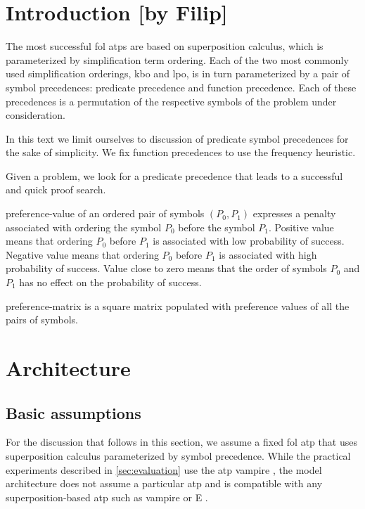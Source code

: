 \newpage

\section{Introduction [by Filip]}

The most successful \gls{fol} \glspl{atp} are based on superposition calculus,
which is parameterized by simplification term ordering.
Each of the two most commonly used simplification orderings, \gls{kbo} and \gls{lpo},
is in turn parameterized by a pair of symbol precedences:
predicate precedence and function precedence.
Each of these precedences is a permutation of the respective symbols of the problem under consideration.

In this text we limit ourselves to discussion of predicate symbol precedences for the sake of simplicity.
We fix function precedences to use the frequency heuristic.

Given a problem, we look for a predicate \gls{precedence} that leads to a successful and quick proof search.

\Gls{preference-value} of an ordered pair of symbols \((P_0, P_1)\) expresses a penalty associated with ordering the symbol \(P_0\) before the symbol \(P_1\).
Positive value means that ordering \(P_0\) before \(P_1\) is associated with low probability of success.
Negative value means that ordering \(P_0\) before \(P_1\) is associated with high probability of success.
Value close to zero means that the order of symbols \(P_0\) and \(P_1\) has no effect on the probability of success.

\Gls{preference-matrix} is a square matrix populated with preference values of all the pairs of symbols.

\section{Architecture}
\label{sec:architecture}

\subsection{Basic assumptions}

For the discussion that follows in this section,
we assume a fixed \gls{fol} \gls{atp} that uses superposition calculus parameterized by symbol precedence.
While the practical experiments described in \autoref{sec:evaluation} use the \gls{atp} \gls{vampire} \cite{Kovacs2013},
the model architecture does not assume a particular \gls{atp}
and is compatible with any superposition-based \gls{atp} such as \gls{vampire} or E \cite{SCV:CADE-2019}.

